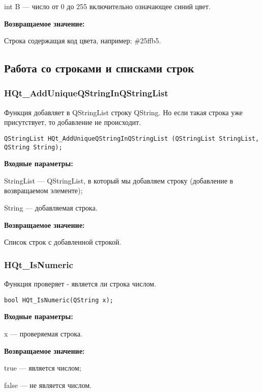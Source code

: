 \documentclass[a4paper,12pt]{article}
\begin{document}
    int B --- число от 0 до 255 включительно означающее синий цвет.

\textbf{Возвращаемое значение:}

Строка содержащая код цвета, например: \#25ffb5.


\subsection{Работа со строками и списками строк}

\subsubsection{HQt\_AddUniqueQStringInQStringList}\label{HQt_AddUniqueQStringInQStringList}

Функция добавляет в QStringList строку QString. Но если такая строка уже присутствует, то добавление не происходит.


\begin{lstlisting}[label=code_syntax_HQt_AddUniqueQStringInQStringList,caption=Синтаксис]
QStringList HQt_AddUniqueQStringInQStringList (QStringList StringList, QString String);
\end{lstlisting}

\textbf{Входные параметры:}
 
StringList --- QStringList, в который мы добавляем строку (добавление в возвращаемом элементе);

     String --- добавляемая строка.

\textbf{Возвращаемое значение:}

Список строк с добавленной строкой.


\subsubsection{HQt\_IsNumeric}\label{HQt_IsNumeric}

Функция проверяет - является ли строка числом.


\begin{lstlisting}[label=code_syntax_HQt_IsNumeric,caption=Синтаксис]
bool HQt_IsNumeric(QString x);
\end{lstlisting}

\textbf{Входные параметры:}

x --- проверяемая строка.

\textbf{Возвращаемое значение:}
 
true --- является числом;

false --- не является числом.
\end{document}
